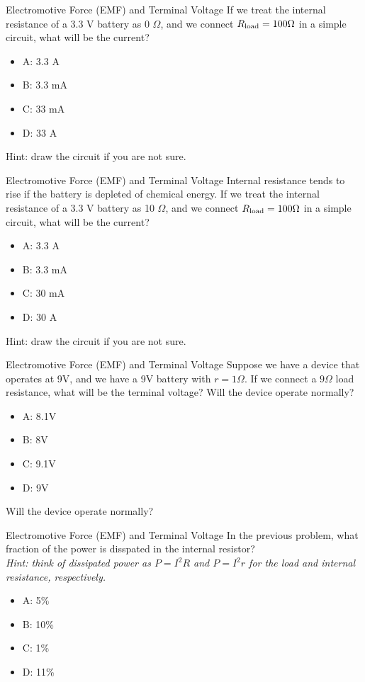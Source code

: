 \documentclass{beamer}
\begin{document}
\begin{frame}{Electromotive Force (EMF) and Terminal Voltage}
If we treat the internal resistance of a 3.3 V battery as 0 $\Omega$, and we connect $R_{\rm load} = 100 \Omega$ in a simple circuit, what will be the current?
\begin{itemize}
\item A: 3.3 A
\item B: 3.3 mA
\item C: 33 mA
\item D: 33 A
\end{itemize}
\footnotesize{Hint: draw the circuit if you are not sure.}
\end{frame}

\begin{frame}{Electromotive Force (EMF) and Terminal Voltage}
Internal resistance tends to rise if the battery is depleted of chemical energy.  If we treat the internal resistance of a 3.3 V battery as 10 $\Omega$, and we connect $R_{\rm load} = 100 \Omega$ in a simple circuit, what will be the current?
\begin{itemize}
\item A: 3.3 A
\item B: 3.3 mA
\item C: 30 mA
\item D: 30 A
\end{itemize}
\footnotesize{Hint: draw the circuit if you are not sure.}
\end{frame}

\begin{frame}{Electromotive Force (EMF) and Terminal Voltage}
Suppose we have a device that operates at 9V, and we have a 9V battery with $r = 1 \Omega$.  If we connect a $9 \Omega$ load resistance, what will be the terminal voltage?  Will the device operate normally?
\begin{itemize}
\item A: 8.1V
\item B: 8V
\item C: 9.1V
\item D: 9V
\end{itemize}
\footnotesize{Will the device operate normally?}
\end{frame}

\begin{frame}{Electromotive Force (EMF) and Terminal Voltage}
In the previous problem, what fraction of the power is disspated in the internal resistor?  \\ \vspace{0.5cm}
\footnotesize
 \textit{Hint: think of dissipated power as $P = I^2 R$ and $P = I^2 r$ for the load and internal resistance, respectively.}
 \normalsize
\begin{itemize}
\item A: 5\%
\item B: 10\%
\item C: 1\%
\item D: 11\%
\end{itemize}
\end{frame}
\end{document}
